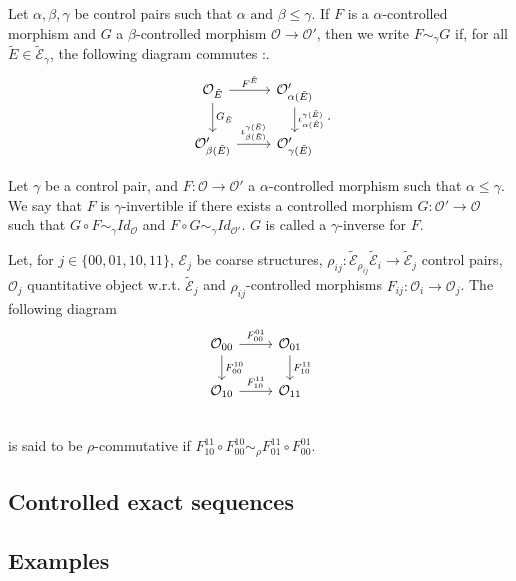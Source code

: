 Let $\alpha,\beta,\gamma$ be control pairs such that $\alpha \text{ and }\beta\leq \gamma$. If $F$ is a $\alpha$-controlled morphism and $G$ a $\beta$-controlled morphism $\mathcal O\rightarrow \mathcal O'$, then we write $F\sim_\gamma G$ if, for all $\tilde E\in \mathcal{\tilde E}_\gamma$, the following diagram commutes :.\[\begin{tikzcd}
\mathcal O_{\tilde E} \arrow{r}{F^{\tilde E}}\arrow{d}{G_{\tilde E}} & \mathcal O'_{\alpha(\tilde E)} \arrow{d}{\iota_{\alpha(\tilde E)}^{\gamma(\tilde E)}} \\
\mathcal O'_{\beta(\tilde E)}\arrow{r}{\iota_{\beta(\tilde E)}^{\gamma(\tilde E)}} & \mathcal O'_{\gamma(\tilde E)}
\end{tikzcd}.\]

\begin{definition}Let $\gamma$ be a control pair, and $F: \mathcal O\rightarrow \mathcal O'$ a $\alpha$-controlled morphism such that $\alpha \leq \gamma$. We say that $F$ is $\gamma$-invertible if there exists a controlled morphism $G: \mathcal O'\rightarrow \mathcal O$ such that $G\circ F \sim_\gamma Id_{\mathcal O}$ and $F\circ G \sim_\gamma Id_{\mathcal O'}$. $G$ is called a $\gamma$-inverse for $F$. \end{definition}

\begin{definition}
Let, for $j\in\{00,01,10,11\}$, $\mathcal{E}_j$ be coarse structures, $\rho_{ij} :\mathcal{\tilde E}_{\rho_{ij}} \mathcal{\tilde E}_i\rightarrow \mathcal{\tilde E}_j$ control pairs, $\mathcal O_j$ quantitative object w.r.t. $\mathcal{\tilde E}_j$ and $\rho_{ij}$-controlled morphisms $F_{ij} : \mathcal O_i\rightarrow \mathcal O_j$. The following diagram
\[\begin{tikzcd}
\mathcal O_{00}\arrow{r}{F_{00}^{01}}\arrow{d}{F_{00}^{10}} & \mathcal O_{01}\arrow{d}{F_{10}^{11}} \\
\mathcal O_{10}\arrow{r}{F_{10}^{11}} & \mathcal O_{11}\\	 
\end{tikzcd}\]
is said to be $\rho$-commutative if $F_{10}^{11}\circ F_{00}^{10} \sim_\rho F_{01}^{11}\circ F_{00}^{01}$.
\end{definition}

\subsection{Controlled exact sequences}

\subsection{Examples}

